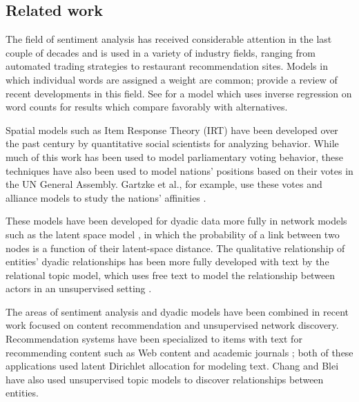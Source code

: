 
\subsection*{Related work}

The field of sentiment analysis has received considerable attention in
the last couple of decades and is used in a variety of industry
fields, ranging from automated trading strategies to restaurant
recommendation sites.  Models in which individual words are assigned a
weight are common; \cite{pang:2008} provide a review of recent
developments in this field.  See \cite{taddy:2012} for a model which
uses inverse regression on word counts for results which compare
favorably with alternatives.

Spatial models such as Item Response Theory (IRT) have been developed
over the past century by quantitative social scientists for analyzing
behavior.  While much of this work has been used to model
parliamentary voting behavior, these techniques have also been used to
model nations' positions based on their votes in the UN General
Assembly. Gartzke et al., for example, use these votes and alliance
models to study the nations' affinities \citep{gartzke:1998}.

These models have been developed for dyadic data more fully in network
models such as the latent space model \citep{hoff:2002,sarkar:2005}, in
which the probability of a link between two nodes is a function of
their latent-space distance.  The qualitative relationship of
entities' dyadic relationships has been more fully developed with text
by the relational topic model, which uses free text to model the
relationship between actors in an unsupervised setting
\citep{chang:2009}.

The areas of sentiment analysis and dyadic models have been combined
in recent work focused on content recommendation and unsupervised
network discovery.  Recommendation systems have been specialized to
items with text for recommending content such as Web content
\citep{agarwal:2010} and academic journals \citep{wang:2011}; both of
these applications used latent Dirichlet allocation for modeling text.
Chang and Blei \citep{chang:2009,chang:2009nubbi} have also
used unsupervised topic models to discover relationships between
entities.


